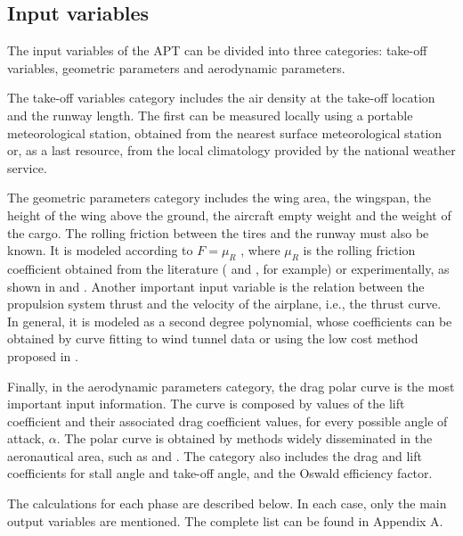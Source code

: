 \documentclass[10pt]{SelfArx} %
\begin{document}
\subsection{Input variables}

The input variables of the APT can be divided into three categories: take-off variables, geometric parameters and aerodynamic parameters.

The {take-off variables} category includes the  air density at the take-off location and the runway length. The first can be measured locally using a portable meteorological station, obtained from the nearest surface meteorological station or, as a last resource,  from the local climatology provided by the national weather service.

The {geometric parameters} category includes the wing area, the wingspan, the height of the wing above the ground, the aircraft empty weight and the weight of the cargo. The rolling friction between the tires and the runway must also be  known. It is modeled according to $F=\mu_R$ \cite{atrito}, where $\mu_R$ is the rolling friction coefficient obtained from the literature (\cite{anderson} and \cite{roskam}, for example) or experimentally, as shown in \cite{atrito_experimento} and \cite{pellegrini_alves}. Another important input variable is the relation between the propulsion system thrust  and the velocity of the airplane, i.e., the thrust curve. 
In general, it is modeled as a second degree polynomial, whose coefficients  can be obtained by curve fitting to wind tunnel  data or using the low cost method proposed in \cite{pellegrini_rodrigues}. 

Finally, in the aerodynamic parameters category, the drag polar curve is the most important input information. The curve is composed by values of the lift coefficient and their associated drag coefficient values, for every possible angle of attack, $\alpha$.  The polar curve is obtained by methods widely disseminated in the aeronautical area, such as \cite{anderson} and \cite{roskam}. The category also includes the drag and lift coefficients for stall angle and take-off angle, and the Oswald efficiency factor.

The calculations for each phase are described below. In each case, only the main output variables are mentioned. The complete list can be found in Appendix A.

\end{document}

